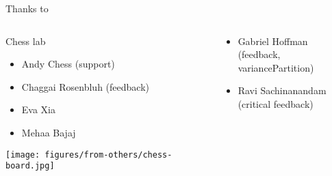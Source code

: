 \documentclass{beamer} %
\begin{document}
\begin{frame}[label=chess-lab]{Thanks to}
\begin{columns}[t]
\begin{column}{0.5\textwidth}

Chess lab
\begin{itemize}
\item Andy Chess {\footnotesize (support)}
\item Chaggai Rosenbluh {\footnotesize (feedback)}
\item Eva Xia
\item Mehaa Bajaj   
\end{itemize}

\texttt{[image: figures/from-others/chess-board.jpg]}
\end{column}

\begin{column}{0.5\textwidth}
\begin{itemize}
\item Gabriel Hoffman\\
{\footnotesize (feedback, variancePartition)}
\item Ravi Sachinanandam\\
{\footnotesize (critical feedback)}
\end{itemize}
\end{column}
\end{columns}
\end{frame}
\end{document}
